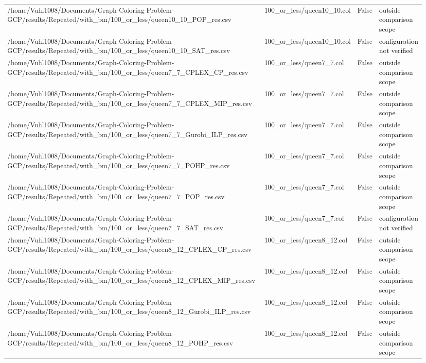 \begin{table}[htbp]
\begin{tabular}{llll}
/home/Vuhl1008/Documents/Graph-Coloring-Problem-GCP/results/Repeated/with\_bm/100\_or\_less/queen10\_10\_POP\_res.csv & 100\_or\_less/queen10\_10.col & False & outside comparison scope \\
/home/Vuhl1008/Documents/Graph-Coloring-Problem-GCP/results/Repeated/with\_bm/100\_or\_less/queen10\_10\_SAT\_res.csv & 100\_or\_less/queen10\_10.col & False & configuration not verified \\
/home/Vuhl1008/Documents/Graph-Coloring-Problem-GCP/results/Repeated/with\_bm/100\_or\_less/queen7\_7\_CPLEX\_CP\_res.csv & 100\_or\_less/queen7\_7.col & False & outside comparison scope \\
/home/Vuhl1008/Documents/Graph-Coloring-Problem-GCP/results/Repeated/with\_bm/100\_or\_less/queen7\_7\_CPLEX\_MIP\_res.csv & 100\_or\_less/queen7\_7.col & False & outside comparison scope \\
/home/Vuhl1008/Documents/Graph-Coloring-Problem-GCP/results/Repeated/with\_bm/100\_or\_less/queen7\_7\_Gurobi\_ILP\_res.csv & 100\_or\_less/queen7\_7.col & False & outside comparison scope \\
/home/Vuhl1008/Documents/Graph-Coloring-Problem-GCP/results/Repeated/with\_bm/100\_or\_less/queen7\_7\_POHP\_res.csv & 100\_or\_less/queen7\_7.col & False & outside comparison scope \\
/home/Vuhl1008/Documents/Graph-Coloring-Problem-GCP/results/Repeated/with\_bm/100\_or\_less/queen7\_7\_POP\_res.csv & 100\_or\_less/queen7\_7.col & False & outside comparison scope \\
/home/Vuhl1008/Documents/Graph-Coloring-Problem-GCP/results/Repeated/with\_bm/100\_or\_less/queen7\_7\_SAT\_res.csv & 100\_or\_less/queen7\_7.col & False & configuration not verified \\
/home/Vuhl1008/Documents/Graph-Coloring-Problem-GCP/results/Repeated/with\_bm/100\_or\_less/queen8\_12\_CPLEX\_CP\_res.csv & 100\_or\_less/queen8\_12.col & False & outside comparison scope \\
/home/Vuhl1008/Documents/Graph-Coloring-Problem-GCP/results/Repeated/with\_bm/100\_or\_less/queen8\_12\_CPLEX\_MIP\_res.csv & 100\_or\_less/queen8\_12.col & False & outside comparison scope \\
/home/Vuhl1008/Documents/Graph-Coloring-Problem-GCP/results/Repeated/with\_bm/100\_or\_less/queen8\_12\_Gurobi\_ILP\_res.csv & 100\_or\_less/queen8\_12.col & False & outside comparison scope \\
/home/Vuhl1008/Documents/Graph-Coloring-Problem-GCP/results/Repeated/with\_bm/100\_or\_less/queen8\_12\_POHP\_res.csv & 100\_or\_less/queen8\_12.col & False & outside comparison scope \\

\end{tabular}
\end{table}
